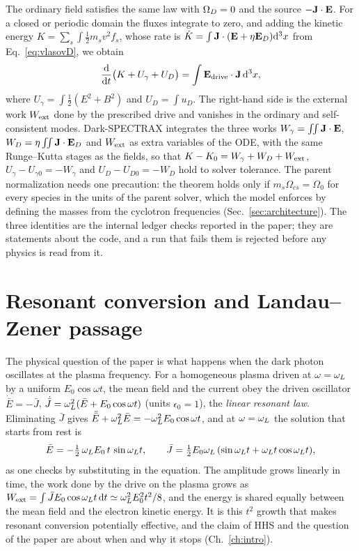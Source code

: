 The ordinary field satisfies the same law with $\Omega_D=0$ and the source $-\mathbf J\cdot\mathbf E$. For a closed or periodic domain the fluxes integrate to zero, and adding the kinetic energy $K=\sum_s\int\tfrac12m_sv^2f_s$, whose rate is $\dot K=\int\mathbf J\cdot(\mathbf E+\eta\mathbf E_D)\mathrm{d}^3x$ from Eq.~\eqref{eq:vlasovD}, we obtain
\begin{equation}
\frac{\mathrm{d}}{\mathrm{d} t}\big(K+U_\gamma+U_D\big)=\int\mathbf E_{\rm drive}\cdot\mathbf J\,\mathrm{d}^3x ,\label{eq:theorem}
\end{equation}
where $U_\gamma=\int\tfrac12(E^2+B^2)$ and $U_D=\int u_D$. The right-hand side is the external work $W_{\rm ext}$ done by the prescribed drive and vanishes in the ordinary and self-consistent modes. Dark-SPECTRAX integrates the three works $W_\gamma=\int\!\!\int\mathbf J\cdot\mathbf E$, $W_D=\eta\int\!\!\int\mathbf J\cdot\mathbf E_D$ and $W_{\rm ext}$ as extra variables of the ODE, with the same Runge--Kutta stages as the fields, so that $K-K_0=W_\gamma+W_D+W_{\rm ext}$, $U_\gamma-U_{\gamma0}=-W_\gamma$ and $U_D-U_{D0}=-W_D$ hold to solver tolerance. The parent normalization needs one precaution: the theorem holds only if $m_s\Omega_{cs}=\Omega_0$ for every species in the units of the parent solver, which the model enforces by defining the masses from the cyclotron frequencies (Sec.~\ref{sec:architecture}). The three identities are the internal ledger checks reported in the paper; they are statements about the code, and a run that fails them is rejected before any physics is read from it.

\section{Resonant conversion and Landau--Zener passage}\label{sec:resonance}

The physical question of the paper is what happens when the dark photon oscillates at the plasma frequency. For a homogeneous plasma driven at $\omega=\omega_L$ by a uniform $E_0\cos\omega t$, the mean field and the current obey the driven oscillator $\dot{\bar E}=-\bar J$, $\dot{\bar J}=\omega_L^2(\bar E+E_0\cos\omega t)$ (units $\epsilon_0=1$), the \emph{linear resonant law}. Eliminating $\bar J$ gives $\ddot{\bar E}+\omega_L^2\bar E=-\omega_L^2E_0\cos\omega t$, and at $\omega=\omega_L$ the solution that starts from rest is
\begin{equation}
\bar E=-\tfrac12\,\omega_L E_0\,t\,\sin\omega_L t ,\qquad \bar J=\tfrac12E_0\omega_L\,(\sin\omega_L t+\omega_L t\cos\omega_L t) ,
\end{equation}
as one checks by substituting in the equation. The amplitude grows linearly in time, the work done by the drive on the plasma grows as $W_{\rm ext}=\int\bar JE_0\cos\omega_L t\,\mathrm{d} t\simeq\omega_L^2E_0^2t^2/8$, and the energy is shared equally between the mean field and the electron kinetic energy. It is this $t^2$ growth that makes resonant conversion potentially effective, and the claim of HHS and the question of the paper are about when and why it stops (Ch.~\ref{ch:intro}).


